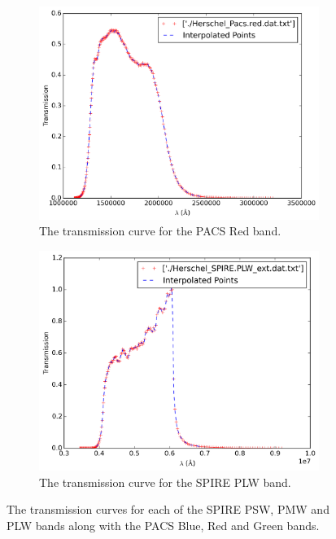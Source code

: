 \documentclass{report}
\begin{document}
\begin{figure}
\begin{subfigure}[b]{.45\linewidth}
\includegraphics[width=\linewidth]{../img/interpolated_red.png}
\caption{The transmission curve for the PACS Red band.}\label{fig:red}
\end{subfigure}
\begin{subfigure}[b]{.45\linewidth}
\includegraphics[width=\linewidth]{../img/interpolated_plw.png}
\caption{The transmission curve for the SPIRE PLW band.}\label{fig:plw}
\end{subfigure}
\caption{The transmission curves for each of the SPIRE PSW, PMW and PLW bands along with the PACS Blue, Red and Green bands.} \label{fig:transmission}
\end{figure}
\end{document}
